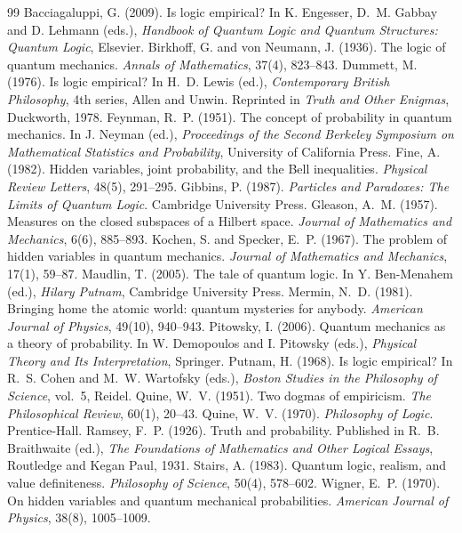 \documentclass{situationist-preprint}
\begin{document}
\begin{thebibliography}{99}\small
{} Bacciagaluppi, G. (2009). Is logic empirical? In K. Engesser, D.~M. Gabbay and D. Lehmann (eds.), \emph{Handbook of Quantum Logic and Quantum Structures: Quantum Logic}, Elsevier.
 Birkhoff, G. and von Neumann, J. (1936). The logic of quantum mechanics. \emph{Annals of Mathematics}, 37(4), 823--843.
 Dummett, M. (1976). Is logic empirical? In H.~D. Lewis (ed.), \emph{Contemporary British Philosophy}, 4th series, Allen and Unwin. Reprinted in \emph{Truth and Other Enigmas}, Duckworth, 1978.
 Feynman, R.~P. (1951). The concept of probability in quantum mechanics. In J. Neyman (ed.), \emph{Proceedings of the Second Berkeley Symposium on Mathematical Statistics and Probability}, University of California Press.
 Fine, A. (1982). Hidden variables, joint probability, and the Bell inequalities. \emph{Physical Review Letters}, 48(5), 291--295.
 Gibbins, P. (1987). \emph{Particles and Paradoxes: The Limits of Quantum Logic}. Cambridge University Press.
 Gleason, A.~M. (1957). Measures on the closed subspaces of a Hilbert space. \emph{Journal of Mathematics and Mechanics}, 6(6), 885--893.
 Kochen, S. and Specker, E.~P. (1967). The problem of hidden variables in quantum mechanics. \emph{Journal of Mathematics and Mechanics}, 17(1), 59--87.
 Maudlin, T. (2005). The tale of quantum logic. In Y. Ben-Menahem (ed.), \emph{Hilary Putnam}, Cambridge University Press.
 Mermin, N.~D. (1981). Bringing home the atomic world: quantum mysteries for anybody. \emph{American Journal of Physics}, 49(10), 940--943.
 Pitowsky, I. (2006). Quantum mechanics as a theory of probability. In W. Demopoulos and I. Pitowsky (eds.), \emph{Physical Theory and Its Interpretation}, Springer.
 Putnam, H. (1968). Is logic empirical? In R.~S. Cohen and M.~W. Wartofsky (eds.), \emph{Boston Studies in the Philosophy of Science}, vol.~5, Reidel.
 Quine, W.~V. (1951). Two dogmas of empiricism. \emph{The Philosophical Review}, 60(1), 20--43.
 Quine, W.~V. (1970). \emph{Philosophy of Logic}. Prentice-Hall.
 Ramsey, F.~P. (1926). Truth and probability. Published in R.~B. Braithwaite (ed.), \emph{The Foundations of Mathematics and Other Logical Essays}, Routledge and Kegan Paul, 1931.
 Stairs, A. (1983). Quantum logic, realism, and value definiteness. \emph{Philosophy of Science}, 50(4), 578--602.
 Wigner, E.~P. (1970). On hidden variables and quantum mechanical probabilities. \emph{American Journal of Physics}, 38(8), 1005--1009.
\end{thebibliography}
\end{document}
